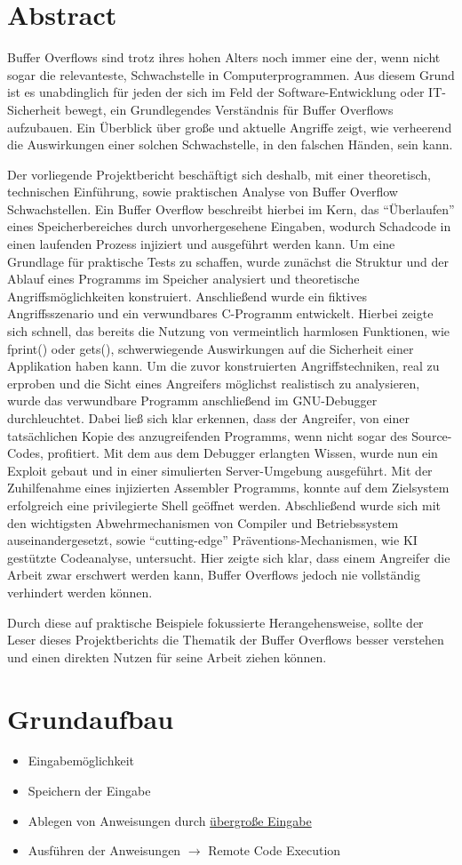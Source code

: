 \section{Abstract}
Buffer Overflows sind trotz ihres hohen Alters noch immer eine der, 
wenn nicht sogar die relevanteste, Schwachstelle in Computerprogrammen. 
Aus diesem Grund ist es unabdinglich für jeden der sich im Feld der Software-Entwicklung 
oder IT-Sicherheit bewegt, ein Grundlegendes Verständnis für Buffer Overflows aufzubauen. 
Ein Überblick über große und aktuelle Angriffe zeigt, wie verheerend die Auswirkungen einer 
solchen Schwachstelle, in den falschen Händen, sein kann. 

Der vorliegende Projektbericht beschäftigt sich deshalb, mit einer theoretisch, 
technischen Einführung, sowie praktischen Analyse von Buffer Overflow Schwachstellen. 
Ein Buffer Overflow beschreibt hierbei im Kern, das “Überlaufen” eines Speicherbereiches 
durch unvorhergesehene Eingaben, wodurch Schadcode in einen laufenden Prozess injiziert 
und ausgeführt werden kann.
Um eine Grundlage für praktische Tests zu schaffen, wurde zunächst  die Struktur und der 
Ablauf eines Programms im Speicher analysiert und theoretische Angriffsmöglichkeiten 
konstruiert. Anschließend wurde ein fiktives Angriffsszenario und ein verwundbares 
C-Programm entwickelt. Hierbei zeigte sich schnell, das bereits die Nutzung von vermeintlich 
harmlosen Funktionen, wie fprint() oder gets(), schwerwiegende Auswirkungen auf die 
Sicherheit einer Applikation haben kann. Um die zuvor konstruierten Angriffstechniken, 
real zu erproben und die Sicht eines Angreifers möglichst realistisch zu analysieren, 
wurde das verwundbare Programm anschließend im GNU-Debugger durchleuchtet. Dabei ließ sich 
klar erkennen, dass der Angreifer, von einer tatsächlichen Kopie des anzugreifenden 
Programms, wenn nicht sogar des Source-Codes, profitiert. Mit dem aus dem Debugger 
erlangten Wissen, wurde nun ein Exploit gebaut und in einer simulierten Server-Umgebung 
ausgeführt. Mit der Zuhilfenahme eines injizierten Assembler Programms, konnte auf dem 
Zielsystem erfolgreich eine privilegierte Shell geöffnet werden.
Abschließend wurde sich mit den wichtigsten Abwehrmechanismen von Compiler und 
Betriebssystem auseinandergesetzt, sowie “cutting-edge” Präventions-Mechanismen, 
wie KI gestützte Codeanalyse, untersucht. Hier zeigte sich klar, dass einem Angreifer 
die Arbeit zwar erschwert werden kann, Buffer Overflows jedoch nie vollständig verhindert 
werden können.

Durch diese auf praktische Beispiele fokussierte Herangehensweise, sollte der Leser 
dieses Projektberichts die Thematik der Buffer Overflows besser verstehen und einen 
direkten Nutzen für seine Arbeit ziehen können.
\pagebreak

\section{Grundaufbau}
    \begin{itemize}
        \item Eingabemöglichkeit
        \item Speichern der Eingabe
        \item Ablegen von Anweisungen durch \underline{übergroße Eingabe}  
        \item Ausführen der Anweisungen $\rightarrow$ Remote Code Execution
    \end{itemize}
